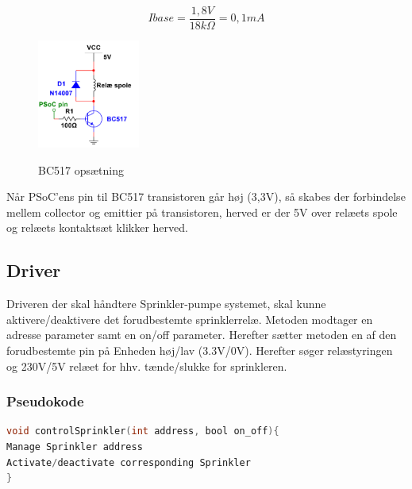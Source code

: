\begin{equation}
Ibase = \frac{1,8V}{18k\Omega} = 0,1mA
\end{equation}

\begin{figure}[H] \centering
{\includegraphics[width=0.3\textwidth]{filer/design/Billeder/BC517}}
\caption{BC517 opsætning}
\label{lab:BC517}
\raggedright
\end{figure} 

Når PSoC'ens pin til BC517 transistoren går høj (3,3V), så skabes der forbindelse mellem collector og emittier på transistoren, herved er der 5V over relæets spole og relæets kontaktsæt klikker herved. 

\subsection{Driver}

Driveren der skal håndtere Sprinkler-pumpe systemet, skal kunne aktivere/deaktivere det forudbestemte sprinklerrelæ. Metoden modtager en adresse parameter samt en on/off parameter. Herefter sætter metoden en af den forudbestemte pin på Enheden høj/lav (3.3V/0V). Herefter søger relæstyringen og 230V/5V relæet for hhv. tænde/slukke for sprinkleren. 


\subsubsection*{Pseudokode}

\begin{lstlisting}[language=C]
void controlSprinkler(int address, bool on_off){
Manage Sprinkler address
Activate/deactivate corresponding Sprinkler
}
\end{lstlisting}





 